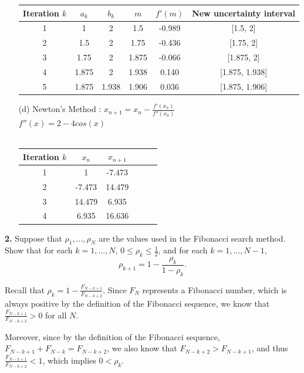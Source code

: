 \documentclass[12pt]{article}
\begin{document}
\begin{itemize}
    \begin{tabular}{|c|c|c|c|c|c|}
        \hline
        Iteration $k$ & $a_k$ & $b_k$ & $m$ & $f'(m)$ & New uncertainty interval \\
        \hline
        1 & 1 & 2 & 1.5 & -0.989 & [1.5, 2] \\
        2 & 1.5 & 2 & 1.75 & -0.436 & [1.75, 2] \\
        3 & 1.75 & 2 & 1.875 & -0.066 & [1.875, 2] \\
        4 & 1.875 & 2 & 1.938 & 0.140 & [1.875, 1.938] \\
        5 & 1.875 & 1.938 & 1.906 & 0.036 & [1.875, 1.906] \\
        \hline
    \end{tabular}

    \item[(d)] 
    Newton's Method : $x_{n+1} = x_n - \frac{f'(x_{n})}{f''(x_{n})}$\\
    $f''(x) = 2 - 4cos(x)$
    \\ \\
    \begin{tabular}{|c|c|c|c|c|c|}
        \hline
        Iteration $k$ & $x_n$ & $x_{n+1}$  \\
        \hline
        1 & 1 & -7.473 \\
        2 & -7.473 & 14.479 \\
        3 & 14.479 & 6.935 \\
        4 & 6.935 & 16.636 \\
        \hline
    \end{tabular}

\end{itemize}

\bigbreak

\begin{mybluebox}
    \textbf{2.} Suppose that \( \rho_1, \dots, \rho_N \) are the values used in the Fibonacci search method. Show that for each \( k = 1, \dots, N \), \( 0 \leq \rho_k \leq \frac{1}{2} \), and for each \( k = 1, \dots, N - 1 \),
    \[
    \rho_{k+1} = 1 - \frac{\rho_k}{1 - \rho_k}.
    \]
    \end{mybluebox}
    
    Recall that \( \rho_k = 1 - \frac{F_{N-k+1}}{F_{N-k+2}} \). Since \( F_N \) represents a Fibonacci number, which is always positive by the definition of the Fibonacci sequence, we know that \( \frac{F_{N-k+1}}{F_{N-k+2}} > 0 \) for all \( N \).
    
    Moreover, since by the definition of the Fibonacci sequence, \( F_{N-k+1} + F_{N-k} = F_{N-k+2} \), we also know that \( F_{N-k+2} > F_{N-k+1} \), and thus \( \frac{F_{N-k+1}}{F_{N-k+2}} < 1 \), which implies \( 0 < \rho_k \).
    
\end{document}
